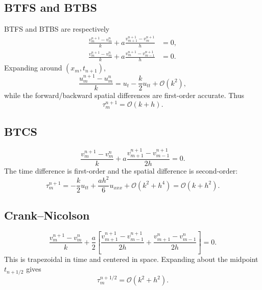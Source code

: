 \documentclass[11pt]{article}
\newcommand{\Oh}{\mathcal{O}}
\begin{document}
\subsection{BTFS and BTBS}

BTFS and BTBS are respectively
\begin{align}
    \frac{v_m^{n+1}-v_m^n}{k}
    +a\frac{v_{m+1}^{n+1}-v_m^{n+1}}{h}
    &=0,\\
    \frac{v_m^{n+1}-v_m^n}{k}
    +a\frac{v_m^{n+1}-v_{m-1}^{n+1}}{h}
    &=0.
\end{align}
Expanding around $(x_m,t_{n+1})$,
\begin{equation}
    \frac{u_m^{n+1}-u_m^n}{k}
    =
    u_t-\frac{k}{2}u_{tt}+\Oh(k^2),
\end{equation}
while the forward/backward spatial differences are first-order accurate.  Thus
\begin{equation}
    \tau_m^{n+1}=\Oh(k+h).
\end{equation}

\subsection{BTCS}

\begin{equation}
    \frac{v_m^{n+1}-v_m^n}{k}
    +a\frac{v_{m+1}^{n+1}-v_{m-1}^{n+1}}{2h}=0.
\end{equation}
The time difference is first-order and the spatial difference is second-order:
\begin{equation}
    \tau_m^{n+1}
    =
    -\frac{k}{2}u_{tt}
    +\frac{a h^2}{6}u_{xxx}
    +\Oh(k^2+h^4)
    =
    \Oh(k+h^2).
\end{equation}

\subsection{Crank--Nicolson}

\begin{equation}
    \frac{v_m^{n+1}-v_m^n}{k}
    +
    \frac{a}{2}
    \left[
        \frac{v_{m+1}^{n+1}-v_{m-1}^{n+1}}{2h}
        +
        \frac{v_{m+1}^{n}-v_{m-1}^{n}}{2h}
    \right]=0.
\end{equation}
This is trapezoidal in time and centered in space.  Expanding about the midpoint $t_{n+1/2}$ gives
\begin{equation}
    \tau_m^{n+1/2}=\Oh(k^2+h^2).
\end{equation}
\end{document}
